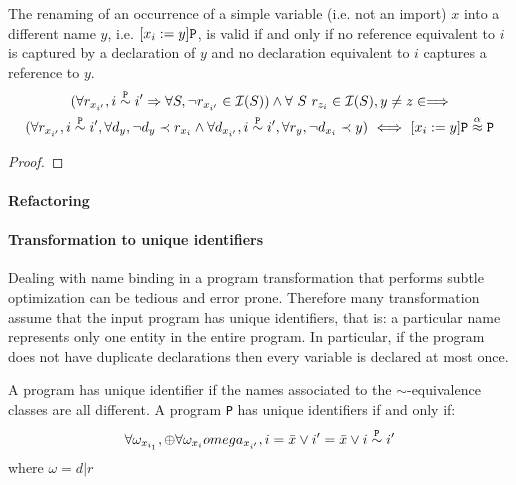 \begin{lemma} The renaming of an occurrence of a simple variable (i.e. not an import) $x$ into a different name $y$, i.e. $[x_i:=y]\text{\tt P}$, is valid if and only if no reference equivalent to $i$ is captured by a declaration of $y$ and no declaration equivalent to $i$ captures a reference to $y$.
  \begin{multline*}
    (\forall r_{x_{i'}}, i \seq{\mtt{P}} {i'} \Rightarrow \forall S, \neg r_{x_{i'}} \in \I{S} ) \wedge \forall\ S\ r_{z_i} \in \I{S}, y \neq z \in \Longrightarrow\\
    (\forall r_{x_{i'}}, i \seq{\mtt{P}} {i'}, \forall d_y, \neg d_y \prec r_{x_i} \wedge
    \forall d_{x_{i'}}, i \seq{\mtt{P}} {i'}, \forall r_y, \neg d_{x_{i}} \prec y)\ \Longleftrightarrow\ 
    [x_{{i}} := y]\mtt{P} \aeq \mtt{P}
  \end{multline*}
\end{lemma}
\begin{proof}
  


\end{proof}

\paragraph{Refactoring}  

\paragraph{Transformation to unique identifiers} Dealing with name binding in a program transformation that performs subtle optimization can be tedious and error prone. Therefore many transformation assume that the input program has unique identifiers, that is: a particular name represents only one entity in the entire program. In particular, if the program does not have duplicate declarations then every variable is declared at most once. 
\begin{definition}[Program with unique identifier] A program has unique identifier if the names associated to the $\sim$-equivalence classes are all different. A program {\tt P} has unique identifiers if and only if:
$$ \forall \omega_{x_{i_1}}, \oplus \forall \omega_{x_i} omega_{x_{i'}}, i = \bar{x} \vee i' = \bar{x} \vee i \stackrel{\text{\tt P}}{\sim} i'$$
where $\omega = d | r$
  
\end{definition}

